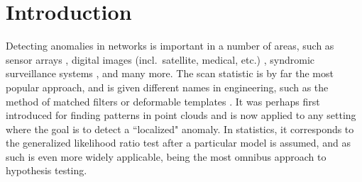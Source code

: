\documentclass[twoside,11pt]{article}
\begin{document}
\section{Introduction}
\label{sec:intro}

Detecting anomalies in networks is important in a number of areas, such as sensor arrays \citep{radiation,overview-sensor}, digital images (incl.~satellite, medical, etc.) \citep{artificial-natural,fire-detection,medical-survey,breast-tumor,brain-tumor}, syndromic surveillance systems \citep{rotz2004advances,heffernan2004ssp,wagner2001esv}, and many more.
The scan statistic \citep{Kul} is by far the most popular approach, and is given different names in engineering, such as the method of matched filters or deformable templates \citep{medical-survey}. 
It was perhaps first introduced for finding patterns in point clouds \citep{Naus65,glaz01} and is now applied to any setting where the goal is to detect a ``localized" anomaly. 
In statistics, it corresponds to the generalized likelihood ratio test after a particular model is assumed, and as such is even more widely applicable, being the most omnibus approach to hypothesis testing.
\end{document}
